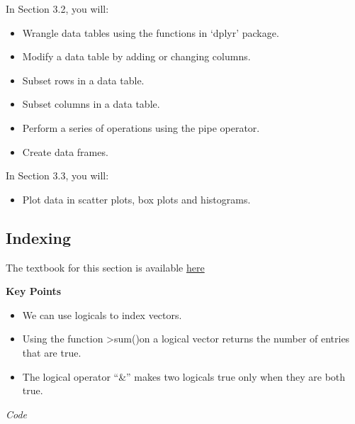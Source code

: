 \documentclass[]{article}
\newenvironment{Shaded}{\begin{snugshade}}{\end{snugshade}}
\newcommand{\CommentTok}[1]{\textcolor[rgb]{0.56,0.35,0.01}{\textit{#1}}}
\newcommand{\DecValTok}[1]{\textcolor[rgb]{0.00,0.00,0.81}{#1}}
\newcommand{\FloatTok}[1]{\textcolor[rgb]{0.00,0.00,0.81}{#1}}
\newcommand{\NormalTok}[1]{#1}
\newcommand{\OperatorTok}[1]{\textcolor[rgb]{0.81,0.36,0.00}{\textbf{#1}}}
\newcommand{\StringTok}[1]{\textcolor[rgb]{0.31,0.60,0.02}{#1}}
\providecommand{\tightlist}{%
  \setlength{\itemsep}{0pt}\setlength{\parskip}{0pt}}
\begin{document}
In Section 3.2, you will:

\begin{itemize}
\tightlist
\item
  Wrangle data tables using the functions in `dplyr' package.
\item
  Modify a data table by adding or changing columns.
\item
  Subset rows in a data table.
\item
  Subset columns in a data table.
\item
  Perform a series of operations using the pipe operator.
\item
  Create data frames.
\end{itemize}

In Section 3.3, you will:

\begin{itemize}
\tightlist
\item
  Plot data in scatter plots, box plots and histograms.
\end{itemize}

\hypertarget{indexing}{%
\subsection{Indexing}\label{indexing}}

The textbook for this section is available
\href{https://rafalab.github.io/dsbook/r-basics.html\#indexing}{here}

\textbf{Key Points}

\begin{itemize}
\tightlist
\item
  We can use logicals to index vectors.
\item
  Using the function \textgreater{}sum()on a logical vector returns the
  number of entries that are true.
\item
  The logical operator ``\&'' makes two logicals true only when they are
  both true.
\end{itemize}

\emph{Code}

\begin{Shaded}
\end{Shaded}
\end{document}
